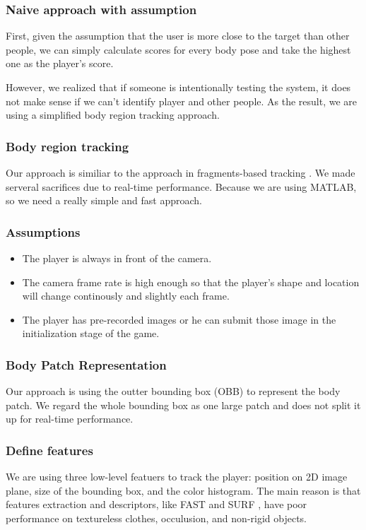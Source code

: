 \documentclass[11pt,twocolumn,letterpaper]{article}
\begin{document}
\subsubsection {Naive approach with assumption}
\par
First, given the assumption that the user is more close to the target than other people, we can simply calculate scores for every body pose and take the highest one as the player's score.
\par
However, we realized that if someone is intentionally testing the system, it does not make sense if we can't identify player and other people. As the result, we are using a simplified body region tracking approach.
\subsubsection{Body region tracking}
\par
Our approach is similiar to the approach in fragments-based tracking  \cite{1640835}. We made serveral sacrifices due to real-time performance. Because  we are using MATLAB, so we need a really simple and fast approach. 
\par
\subsubsection*{Assumptions}
\begin{itemize}
\item The player is always in front of the camera.
\item The camera frame rate is high enough so that the player's shape and location will change continously and slightly each frame.
\item The player has pre-recorded images or he can submit those image in the initialization stage of the game.
\end{itemize}
\subsubsection*{Body Patch Representation}
\par
Our approach is using the outter bounding box (OBB) to represent the body patch. We regard the whole bounding box as one large patch and does not split it up for real-time performance.
\subsubsection*{Define features}
We are using three low-level featuers to track the player: position on 2D image plane, size of the bounding box, and the color histogram. The main reason is that features extraction and descriptors, like FAST \cite{1544896} and SURF \cite{Bay2006}, have poor performance on textureless clothes, occulusion, and non-rigid objects.
\end{document}
